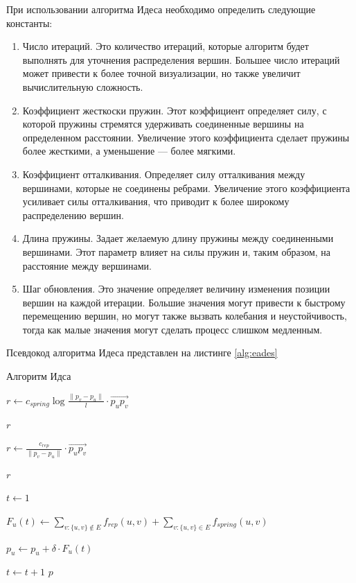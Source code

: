 \documentclass[14pt, russian]{scrartcl}
\begin{document}
При использовании алгоритма Идеса необходимо определить следующие константы:

\begin{enumerate}
  \item{Число итераций. Это количество итераций, которые алгоритм будет выполнять для уточнения распределения вершин. Большее число итераций может привести к более точной визуализации, но также увеличит вычислительную сложность.}
  \item{Коэффициент жесткоски пружин. Этот коэффициент определяет силу, с которой пружины стремятся удерживать соединенные вершины на определенном расстоянии. Увеличение этого коэффициента сделает пружины более жесткими, а уменьшение — более мягкими.}
  \item{Коэффициент отталкивания. Определяет силу отталкивания между вершинами, которые не соединены ребрами. Увеличение этого коэффициента усиливает силы отталкивания, что приводит к более широкому распределению вершин.}
  \item{Длина пружины. Задает желаемую длину пружины между соединенными вершинами. Этот параметр влияет на силы пружин и, таким образом, на расстояние между вершинами. }
  \item{Шаг обновления. Это значение определяет величину изменения позиции вершин на каждой итерации. Большие значения могут привести к быстрому перемещению вершин, но могут также вызвать колебания и неустойчивость, тогда как малые значения могут сделать процесс слишком медленным.}
\end{enumerate}

Псевдокод алгоритма Идеса представлен на листинге \ref{alg:eades}

\begin{algorithm}[H]
\caption{Алгоритм Идса}\label{alg:eades}
\begin{algorithmic}

  \State $r \gets c_{spring}\log{\frac{\|p_v - p_u \|}{l}}  \cdot \overrightarrow{p_u p_v}  $
  
  \Return $r$  
  \EndFunction

 
  \State $r \gets \frac{c_{rep}}{\|p_v - p_u \|} \cdot \overrightarrow{p_u p_v}  $
  
  \Return $r$  
  \EndFunction
 

	\State $t \gets 1$

			\State $F_{u}(t) \gets \sum_{v:\{u,v\} \notin E}{f_{rep}(u, v)} + \sum_{v:\{u,v\} \in E}{f_{spring}(u, v)}$
		

		\EndFor
			\State $p_u \gets p_u + \delta \cdot F_u(t)$
		\EndFor
		
		\State $t \gets t + 1$
	\EndWhile
	\Return $p$
	\EndFunction


\end{algorithmic}
\end{algorithm}
\end{document}
